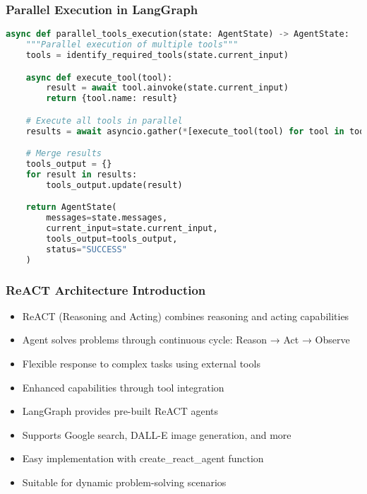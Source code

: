 \begin{frame}[fragile]\frametitle{Parallel Execution in LangGraph}
      \begin{lstlisting}[language=Python, basicstyle=\tiny]
async def parallel_tools_execution(state: AgentState) -> AgentState:
    """Parallel execution of multiple tools"""
    tools = identify_required_tools(state.current_input)

    async def execute_tool(tool):
        result = await tool.ainvoke(state.current_input)
        return {tool.name: result}

    # Execute all tools in parallel
    results = await asyncio.gather(*[execute_tool(tool) for tool in tools])

    # Merge results
    tools_output = {}
    for result in results:
        tools_output.update(result)

    return AgentState(
        messages=state.messages,
        current_input=state.current_input,
        tools_output=tools_output,
        status="SUCCESS"
    )
      \end{lstlisting}
\end{frame}

\begin{frame}[fragile]\frametitle{ReACT Architecture Introduction}
      \begin{itemize}
        \item ReACT (Reasoning and Acting) combines reasoning and acting capabilities
        \item Agent solves problems through continuous cycle: Reason → Act → Observe
        \item Flexible response to complex tasks using external tools
        \item Enhanced capabilities through tool integration
        \item LangGraph provides pre-built ReACT agents
        \item Supports Google search, DALL-E image generation, and more
        \item Easy implementation with create\_react\_agent function
        \item Suitable for dynamic problem-solving scenarios
      \end{itemize}
\end{frame}

